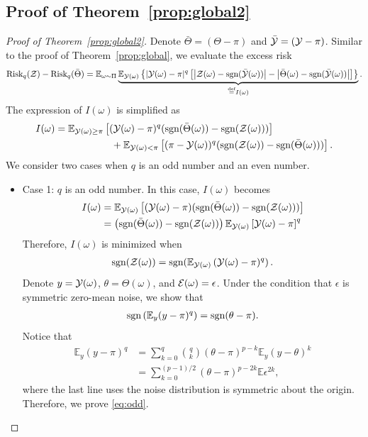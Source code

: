 \documentclass[twoside,11pt]{article}
\theoremstyle{definition}
\newcommand*{\KeepStyleUnderBrace}[1]{%
  \mathop{%
    \mathchoice
    {\underbrace{\displaystyle#1}}%
    {\underbrace{\textstyle#1}}%
    {\underbrace{\scriptstyle#1}}%
    {\underbrace{\scriptscriptstyle#1}}%
  }\limits
}
\def\sign{\textup{sgn}}
\def\risk{\textup{Risk}}
\begin{document}
\subsection{Proof of Theorem~\ref{prop:global2}}
\begin{proof}[Proof of Theorem~\ref{prop:global2}]
Denote $\bar \Theta=(\Theta-\pi)$ and $\bar {\mathcal{Y}}=(\mathcal{Y}-\pi)$. Similar to the proof of Theorem~\ref{prop:global}, we evaluate the excess risk 
\begin{equation}\label{eq:risk}
\risk_q(\tZ)- \risk_q(\bar \Theta) = \mathbb{E}_{\omega\sim \Pi}\KeepStyleUnderBrace{\mathbb{E}_{\tY(\omega)}\left\{|\tY(\omega)-\pi|^q\left[\left|\tZ(\omega)-\sign(\bar \tY(\omega)) \right|-\left|\bar\Theta(\omega)-\sign(\bar \tY(\omega))\right|\right]\right\}}_{\stackrel{\text{def}}{=}I(\omega)}.
\end{equation}
The expression of $I(\omega)$ is simplified as
\begin{align}\label{eq:I_q}
I(\omega)&= \mathbb{E}_{\tY(\omega)\geq \pi}\left[ (\tY(\omega)-\pi)^q(\sign(\bar \Theta(\omega))-\sign(\tZ(\omega)))\right]\\&\hspace{2cm}+\mathbb{E}_{\tY(\omega)< \pi}\left[ (\pi-\tY(\omega))^q(\sign(\tZ(\omega))-\sign(\bar \Theta(\omega)))\right].
\end{align}
We consider two cases when $q$ is an odd number and an even number.
\begin{itemize}[leftmargin=*,topsep=0pt,itemsep=-1ex,partopsep=1ex,parsep=1ex]
    \item Case 1: $q$ is an odd number. In this case, $I(\omega)$ becomes
    \begin{align}
        I(\omega)  &=  \mathbb{E}_{\tY(\omega)}\left[(\tY(\omega)-\pi)(\sign(\bar\Theta(\omega))-\sign(\tZ(\omega)))\right]\\&=
        \left(\sign(\bar\Theta(\omega))-\sign(\tZ(\omega))\right)\mathbb{E}_{\tY(\omega)}\left[\tY(\omega)-\pi\right]^q
    \end{align}
    Therefore, $I(\omega)$ is minimized when
    \begin{align}\label{eq:oddt}
        \sign(\tZ(\omega)) = \sign(\mathbb{E}_{\tY(\omega)}\left(\tY(\omega)-\pi)^q\right).
    \end{align}
    Denote $y=\mathcal{Y}(\omega)$, $\theta = \Theta(\omega)$, and $\mathcal{E}(\omega) = \epsilon$.
    Under the condition that $\epsilon$ is symmetric zero-mean noise, we show that
    \begin{align}\label{eq:odd}
        \sign\left(\mathbb{E}_y(y-\pi)^q\right) = \sign(\theta-\pi).
    \end{align}
    Notice that 
    \begin{align}
        \mathbb{E}_y(y-\pi)^q & = \sum_{k = 0}^q {q\choose k}(\theta-\pi)^{p-k}\mathbb{E}_y(y-\theta)^k\\&= \sum_{k=0}^{(p-1)/2}(\theta-\pi)^{p-2k}\mathbb{E}\epsilon^{2k},
    \end{align}
    where the last line uses the noise distribution is symmetric about the  origin. Therefore, we prove  \eqref{eq:odd}.
    

\end{itemize}
\end{proof}
\end{document}
